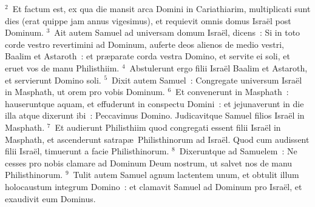 ${}^{2}$~Et factum est, ex qua die mansit arca Domini in Cariathiarim, multiplicati sunt dies (erat quippe jam annus vigesimus), et requievit omnis domus Isra\"el post Dominum.
${}^{3}$~Ait autem Samuel ad universam domum Isra\"el, dicens~: Si in toto corde vestro revertimini ad Dominum, auferte deos alienos de medio vestri, Baalim et Astaroth~: et pr\ae parate corda vestra Domino, et servite ei soli, et eruet vos de manu Philisthiim.
${}^{4}$~Abstulerunt ergo filii Isra\"el Baalim et Astaroth, et servierunt Domino soli.
${}^{5}$~Dixit autem Samuel~: Congregate universum Isra\"el in Masphath, ut orem pro vobis Dominum.
${}^{6}$~Et convenerunt in Masphath~: hauseruntque aquam, et effuderunt in conspectu Domini~: et jejunaverunt in die illa atque dixerunt ibi~: Peccavimus Domino. Judicavitque Samuel filios Isra\"el in Masphath.
${}^{7}$~Et audierunt Philisthiim quod congregati essent filii Isra\"el in Masphath, et ascenderunt satrap\ae\ Philisthinorum ad Isra\"el. Quod cum audissent filii Isra\"el, timuerunt a facie Philisthinorum.
${}^{8}$~Dixeruntque ad Samuelem~: Ne cesses pro nobis clamare ad Dominum Deum nostrum, ut salvet nos de manu Philisthinorum.
${}^{9}$~Tulit autem Samuel agnum lactentem unum, et obtulit illum holocaustum integrum Domino~: et clamavit Samuel ad Dominum pro Isra\"el, et exaudivit eum Dominus.


